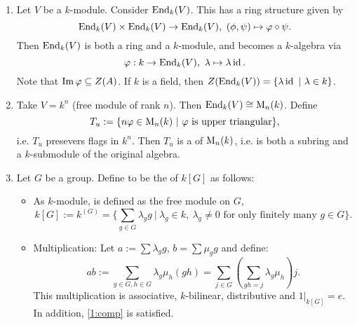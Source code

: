 \begin{bsp}
	\begin{enumerate}
		\item Let $V$ be a $k$-module. Consider $\operatorname{End}_k(V)$. This has a ring structure given by
		\[
		\operatorname{End}_k(V)\times \operatorname{End}_k(V)\to \operatorname{End}_k(V),~(\phi,\psi)\mapsto \varphi\circ \psi.
		\]
		Then $\operatorname{End}_k(V)$ is both a ring and a $k$-module, and becomes a $k$-algebra via
		\[
		\varphi: k\to \operatorname{End}_k(V),~\lambda \mapsto \lambda \operatorname{id}.
		\]
		Note that $\operatorname{Im} \varphi \subseteq Z(A)$. If $k$ is a field, then $Z(\operatorname{End}_k(V))=\{\lambda \operatorname{id} ~|~\lambda \in k\}$.
		\item Take $V=k^n$ (free module of rank $n$). Then $\operatorname{End}_k(V)\cong \operatorname{M}_n(k)$. Define
		\[
		T_u:=\{ n\varphi \in \operatorname{M}_n(k)~|~\varphi \text{ is upper triangular}\},
		\]
		i.e. $T_u$ presevers flags in $k^n$. Then $T_u$ is a  of $\operatorname{M}_n(k)$, i.e. is both a subring and a $k$-submodule of the original algebra.
		\item Let $G$ be a group. Define to be the  of $k[G]$ as follows:
		\begin{itemize}
			\item As $k$-module, is defined as the free module on $G$,
			\[
			k[G]:= k^{(G)} = \{ \sum_{g\in G}\lambda_{g}g~|~\lambda_g\in k,~\lambda_g\neq 0\text{ for only finitely many }g\in G\}.
			\]
			\item Multiplication: Let $a:= \sum \lambda_g g$, $b=\sum \mu_g g$ and define:
			\[
			ab:= \sum_{g\in G,h\in G}\lambda_g\mu_h(gh) = \sum_{j\in G}\left(\sum_{gh=j}\lambda_g\mu_h\right)j.\]
			This multiplication is associative, $k$-bilinear, distributive and $\left.1\right|_{k[G]}=e$. In addition, \eqref{1:comp} is satisfied.
	\end{itemize}
\end{enumerate}
\end{bsp}
